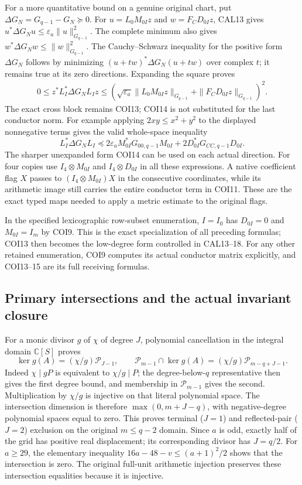 For a more quantitative bound on a genuine original chart, put
$\Delta G_N=G_{q-1}-G_N\succeq0$.
For $u=L_0M_{0I}z$ and $w=F_CD_{0I}z$, CAL13 gives
$u^*\Delta G_Nu\le\varepsilon_a\|u\|_{G_{q-1}}^2$.
The complete minimum also gives
$w^*\Delta G_Nw\le\|w\|_{G_{q-1}}^2$.
The Cauchy--Schwarz inequality for the positive form $\Delta G_N$
follows by minimizing $(u+tw)^*\Delta G_N(u+tw)$ over complex $t$;
it remains true at its zero directions. Expanding the square proves
\[
 \begin{split}
 0\le z^*L_I^*\Delta G_NL_Iz
 \le\left(\sqrt{\varepsilon_a}
       \|L_0M_{0I}z\|_{G_{q-1}}
       +\|F_CD_{0I}z\|_{G_{q-1}}\right)^2.
 \end{split}                                                     \tag{COI14}
\]
The exact cross block remains COI13; COI14 is not substituted for
the last conductor norm. For example applying
$2xy\le x^2+y^2$ to the displayed nonnegative terms gives
the valid whole-space inequality
\[
 L_I^*\Delta G_NL_I
 \preceq2\varepsilon_a M_{0I}^*G_{00,q-1}M_{0I}
             +2D_{0I}^*G_{CC,q-1}D_{0I}.
 \tag{COI15}
\]
The sharper unexpanded form COI14 can be used on each actual
direction. For four copies use $I_4\otimes M_{0I}$ and
$I_4\otimes D_{0I}$ in all these expressions. A native coefficient
flag $X$ passes to $(I_4\otimes M_{0I})X$ in the consecutive
coordinates, while its arithmetic image still carries the entire
conductor term in COI11. These are the exact typed maps needed to
apply a metric estimate to the original flags.

In the specified lexicographic row-subset enumeration, $I=I_0$
has $D_{0I}=0$ and $M_{0I}=I_m$ by COI9. This is the exact
specialization of all preceding formulas; COI13 then becomes the
low-degree form controlled in CAL13--18. For any other retained
enumeration, COI9 computes its actual conductor matrix explicitly,
and COI13--15 are its full receiving formulas.

\subsection{Primary intersections and the actual invariant closure}

For a monic divisor $g$ of $\chi$ of degree $J$, polynomial
cancellation in the integral domain $\mathbb C[S]$ proves
\[
 \ker g(A)=(\chi/g)\mathcal P_{J-1},\qquad
 \mathcal P_{m-1}\cap\ker g(A)
      =(\chi/g)\mathcal P_{m-q+J-1}.
 \tag{COI16}
\]
Indeed $\chi\mid gP$ is equivalent to $\chi/g\mid P$;
the degree-below-$q$ representative then gives the first degree
bound, and membership in $\mathcal P_{m-1}$ gives the second.
Multiplication by $\chi/g$ is injective on that literal polynomial
space. The intersection dimension is therefore
$\max(0,m+J-q)$, with negative-degree polynomial spaces equal
to zero. This proves terminal ($J=1$) and reflected-pair ($J=2$)
exclusion on the original $m\le q-2$ domain.
Since $a$ is odd, exactly half of the grid has positive real
displacement; its corresponding divisor has $J=q/2$.
For $a\ge29$, the elementary inequality
$16a-48-v\le(a+1)^2/2$ shows that the intersection is zero.
The original full-unit arithmetic injection preserves these
intersection equalities because it is injective.


